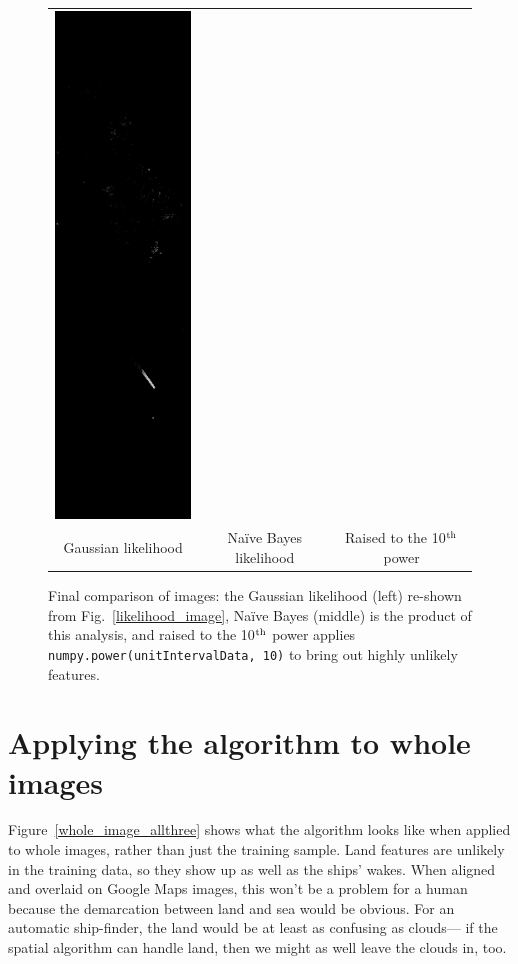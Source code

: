 \documentclass[12pt]{article}
\begin{document}
\begin{figure}
\begin{center}
\begin{tabular}{c c c}
\includegraphics[width=0.28\linewidth]{likelihood_naivebayes_power10_image.png} \\
Gaussian likelihood & Na\"ive Bayes likelihood & Raised to the 10$^{\mbox{\scriptsize th}}$ power
\end{tabular}
\end{center}
\caption{Final comparison of images: the Gaussian likelihood (left) re-shown from Fig.~\ref{likelihood_image}, Na\"ive Bayes (middle) is the product of this analysis, and raised to the 10$^{\mbox{\scriptsize th}}$ power applies {\tt numpy.power(unitIntervalData, 10)} to bring out highly unlikely features. \label{likelihood_naivebayes_image}}
\end{figure}

\section{Applying the algorithm to whole images}

Figure~\ref{whole_image_allthree} shows what the algorithm looks like
when applied to whole images, rather than just the training sample.
Land features are unlikely in the training data, so they show up as
well as the ships' wakes.  When aligned and overlaid on Google Maps
images, this won't be a problem for a human because the demarcation
between land and sea would be obvious.  For an automatic ship-finder,
the land would be at least as confusing as clouds--- if the spatial
algorithm can handle land, then we might as well leave the clouds in,
too.
\end{document}
